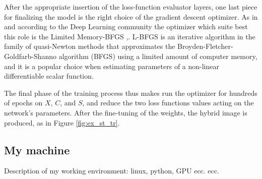     After the appropriate insertion of the loss-function evaluator layers, one last piece for finalizing the model is the right choice of the gradient descent optimizer. As in \cite{1508.06576} and according to the Deep Learning community the optimizer which suite best this role is the Limited Memory-BFGS \cite{10.1093/imamat/6.1.76},\cite{shanno1970conditioning}. L-BFGS is an iterative algorithm in the family of quasi-Newton methods that approximates the Broyden-Fletcher-Goldfarb-Shanno algorithm (BFGS) using a limited amount of computer memory, and it is a popular choice when estimating parameters of a non-linear differentiable scalar function.

    The final phase of the training process thus makes run the optimizer for hundreds of epochs on $X$, $C$, and $S$, and reduce the two loss functions values acting on the network's parameters. After the fine-tuning of the weights, the hybrid image is produced, as in Figure \ref{fig:ex_st_tr}.

\subsection{My machine} \label{ssec:my_machine}
    Description of my working environment: linux, python, GPU ecc. ecc.

